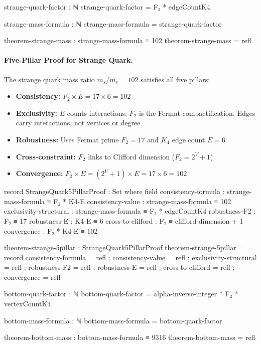 \documentclass[11pt,a4paper]{book}
\begin{document}
\begin{code}
strange-quark-factor : ℕ
strange-quark-factor = F₂ * edgeCountK4

strange-mass-formula : ℕ
strange-mass-formula = strange-quark-factor

theorem-strange-mass : strange-mass-formula ≡ 102
theorem-strange-mass = refl
\end{code}

\paragraph{Five-Pillar Proof for Strange Quark.}
The strange quark mass ratio $m_s/m_e = 102$ satisfies all five pillars:
\begin{itemize}
\item \textbf{Consistency:} $F_2 \times E = 17 \times 6 = 102$
\item \textbf{Exclusivity:} $E$ counts interactions; $F_2$ is the Fermat compactification. Edges carry interactions, not vertices or degree
\item \textbf{Robustness:} Uses Fermat prime $F_2 = 17$ and $K_4$ edge count $E = 6$
\item \textbf{Cross-constraint:} $F_2$ links to Clifford dimension ($F_2 = 2^V + 1$)
\item \textbf{Convergence:} $F_2 \times E = (2^V + 1) \times E = 17 \times 6 = 102$
\end{itemize}

\begin{code}
record StrangeQuark5PillarProof : Set where
  field
    consistency-formula : strange-mass-formula ≡ F₂ * K4-E
    consistency-value : strange-mass-formula ≡ 102
    exclusivity-structural : strange-mass-formula ≡ F₂ * edgeCountK4
    robustness-F2 : F₂ ≡ 17
    robustness-E : K4-E ≡ 6
    cross-to-clifford : F₂ ≡ clifford-dimension + 1
    convergence : F₂ * K4-E ≡ 102

theorem-strange-5pillar : StrangeQuark5PillarProof
theorem-strange-5pillar = record
  { consistency-formula = refl
  ; consistency-value = refl
  ; exclusivity-structural = refl
  ; robustness-F2 = refl
  ; robustness-E = refl
  ; cross-to-clifford = refl
  ; convergence = refl
  }
\end{code}

\begin{code}
bottom-quark-factor : ℕ
bottom-quark-factor = alpha-inverse-integer * F₂ * vertexCountK4

bottom-mass-formula : ℕ
bottom-mass-formula = bottom-quark-factor

theorem-bottom-mass : bottom-mass-formula ≡ 9316
theorem-bottom-mass = refl
\end{code}
\end{document}
